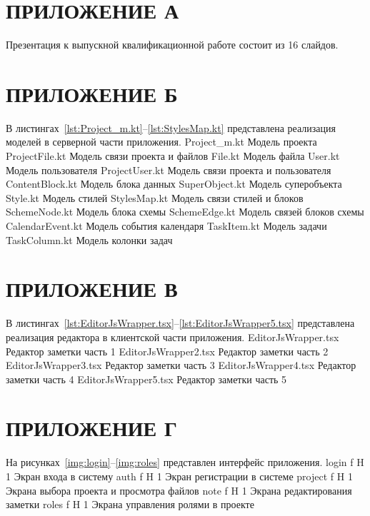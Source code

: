 \chapter*{ПРИЛОЖЕНИЕ А}
	Презентация к выпускной квалификационной работе состоит из 16 слайдов.
\chapter*{ПРИЛОЖЕНИЕ Б}
	В листингах~\ref{lst:Project_m.kt}--\ref{lst:StylesMap.kt} представлена реализация моделей в серверной части приложения. 
		{Project_m.kt}
		{Модель проекта}
		{ProjectFile.kt}
		{Модель связи проекта и файлов}
	\clearpage
		{File.kt}
		{Модель файла}
	\clearpage
		{User.kt}
		{Модель пользователя}
	\clearpage
		{ProjectUser.kt}
		{Модель связи проекта и пользователя}
		{ContentBlock.kt}
		{Модель блока данных}
	\clearpage
		{SuperObject.kt}
		{Модель суперобъекта}
		{Style.kt}
		{Модель стилей}
		{StylesMap.kt}
		{Модель связи стилей и блоков}	
	\clearpage
		{SchemeNode.kt}
		{Модель блока схемы}
		{SchemeEdge.kt}
		{Модель связей блоков схемы}	
		{CalendarEvent.kt}
		{Модель события календаря}
	\clearpage
		{TaskItem.kt}
		{Модель задачи}
		{TaskColumn.kt}
		{Модель колонки задач}	
\chapter*{ПРИЛОЖЕНИЕ В}
	В листингах~\ref{lst:EditorJsWrapper.tsx}--\ref{lst:EditorJsWrapper5.tsx} представлена реализация редактора в клиентской части приложения. 
		{EditorJsWrapper.tsx}
		{Редактор заметки часть 1}
	\clearpage
		{EditorJsWrapper2.tsx}
		{Редактор заметки часть 2}
	\clearpage
		{EditorJsWrapper3.tsx}
		{Редактор заметки часть 3}
	\clearpage
		{EditorJsWrapper4.tsx}
		{Редактор заметки часть 4}
	\clearpage
		{EditorJsWrapper5.tsx}
		{Редактор заметки часть 5}
\chapter*{ПРИЛОЖЕНИЕ Г\\}
	На рисунках~\ref{img:login}--\ref{img:roles} представлен интерфейс приложения.
		{login}
		{f}
		{H}
		{1\textwidth}
		{Экран входа в систему}
		{auth}
		{f}
		{H}
		{1\textwidth}
		{Экран регистрации в системе}
		{project}
		{f}
		{H}
		{1\textwidth}
		{Экрана выбора проекта и просмотра файлов}
		{note}
		{f}
		{H}
		{1\textwidth}
		{Экрана редактирования заметки}
		{roles}
		{f}
		{H}
		{1\textwidth}
		{Экрана управления ролями в проекте}
